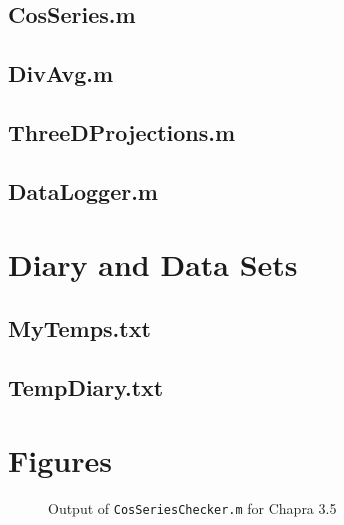 \documentclass{article}
\begin{document}
\subsection{CosSeries.m}
\subsection{DivAvg.m}
\subsection{ThreeDProjections.m}
\subsection{DataLogger.m}
\pagebreak

\section{Diary and Data Sets}
\subsection{MyTemps.txt}

\subsection{TempDiary.txt}
\clearpage

\section{Figures}


\begin{figure}[htb!p]
\begin{center}
\end{center}
\end{figure}

\begin{figure}[htb!p]
\begin{center}
\caption{Output of {\tt CosSeriesChecker.m} for Chapra 3.5}
\end{center}
\end{figure}
\clearpage
\end{document}
